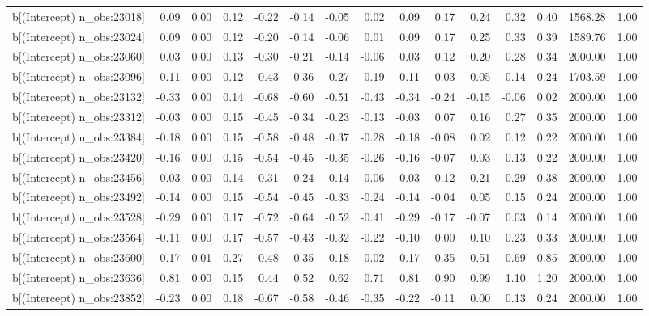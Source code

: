 \begin{table}[ht]
\begin{tabular}{rrrrrrrrrrrrrrr}
  b[(Intercept) n\_obs:23018] & 0.09 & 0.00 & 0.12 & -0.22 & -0.14 & -0.05 & 0.02 & 0.09 & 0.17 & 0.24 & 0.32 & 0.40 & 1568.28 & 1.00 \\ 
  b[(Intercept) n\_obs:23024] & 0.09 & 0.00 & 0.12 & -0.20 & -0.14 & -0.06 & 0.01 & 0.09 & 0.17 & 0.25 & 0.33 & 0.39 & 1589.76 & 1.00 \\ 
  b[(Intercept) n\_obs:23060] & 0.03 & 0.00 & 0.13 & -0.30 & -0.21 & -0.14 & -0.06 & 0.03 & 0.12 & 0.20 & 0.28 & 0.34 & 2000.00 & 1.00 \\ 
  b[(Intercept) n\_obs:23096] & -0.11 & 0.00 & 0.12 & -0.43 & -0.36 & -0.27 & -0.19 & -0.11 & -0.03 & 0.05 & 0.14 & 0.24 & 1703.59 & 1.00 \\ 
  b[(Intercept) n\_obs:23132] & -0.33 & 0.00 & 0.14 & -0.68 & -0.60 & -0.51 & -0.43 & -0.34 & -0.24 & -0.15 & -0.06 & 0.02 & 2000.00 & 1.00 \\ 
  b[(Intercept) n\_obs:23312] & -0.03 & 0.00 & 0.15 & -0.45 & -0.34 & -0.23 & -0.13 & -0.03 & 0.07 & 0.16 & 0.27 & 0.35 & 2000.00 & 1.00 \\ 
  b[(Intercept) n\_obs:23384] & -0.18 & 0.00 & 0.15 & -0.58 & -0.48 & -0.37 & -0.28 & -0.18 & -0.08 & 0.02 & 0.12 & 0.22 & 2000.00 & 1.00 \\ 
  b[(Intercept) n\_obs:23420] & -0.16 & 0.00 & 0.15 & -0.54 & -0.45 & -0.35 & -0.26 & -0.16 & -0.07 & 0.03 & 0.13 & 0.22 & 2000.00 & 1.00 \\ 
  b[(Intercept) n\_obs:23456] & 0.03 & 0.00 & 0.14 & -0.31 & -0.24 & -0.14 & -0.06 & 0.03 & 0.12 & 0.21 & 0.29 & 0.38 & 2000.00 & 1.00 \\ 
  b[(Intercept) n\_obs:23492] & -0.14 & 0.00 & 0.15 & -0.54 & -0.45 & -0.33 & -0.24 & -0.14 & -0.04 & 0.05 & 0.15 & 0.24 & 2000.00 & 1.00 \\ 
  b[(Intercept) n\_obs:23528] & -0.29 & 0.00 & 0.17 & -0.72 & -0.64 & -0.52 & -0.41 & -0.29 & -0.17 & -0.07 & 0.03 & 0.14 & 2000.00 & 1.00 \\ 
  b[(Intercept) n\_obs:23564] & -0.11 & 0.00 & 0.17 & -0.57 & -0.43 & -0.32 & -0.22 & -0.10 & 0.00 & 0.10 & 0.23 & 0.33 & 2000.00 & 1.00 \\ 
  b[(Intercept) n\_obs:23600] & 0.17 & 0.01 & 0.27 & -0.48 & -0.35 & -0.18 & -0.02 & 0.17 & 0.35 & 0.51 & 0.69 & 0.85 & 2000.00 & 1.00 \\ 
  b[(Intercept) n\_obs:23636] & 0.81 & 0.00 & 0.15 & 0.44 & 0.52 & 0.62 & 0.71 & 0.81 & 0.90 & 0.99 & 1.10 & 1.20 & 2000.00 & 1.00 \\ 
  b[(Intercept) n\_obs:23852] & -0.23 & 0.00 & 0.18 & -0.67 & -0.58 & -0.46 & -0.35 & -0.22 & -0.11 & 0.00 & 0.13 & 0.24 & 2000.00 & 1.00 \\ 

\end{tabular}
\end{table}

